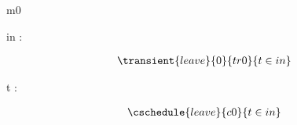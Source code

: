 \documentclass[12pt]{amsart}
\title{}
\author{}
\date{} %
\begin{document}
\maketitle
\tableofcontents


\begin{machine}{m0}


%
	\begin{variable}
		in : \set[\TRAIN]
	\end{variable}
%

\begin{use:set}{\TRAIN} \end{use:set}

\begin{align*}
\transient{leave}{0}{tr0}
{	t \in in	}
\end{align*}

\begin{dummy}
	t : \TRAIN
\end{dummy}

\begin{align*}
\cschedule{leave}{c0}
{	t \in in	}
\end{align*}

\end{machine}
\end{document}
